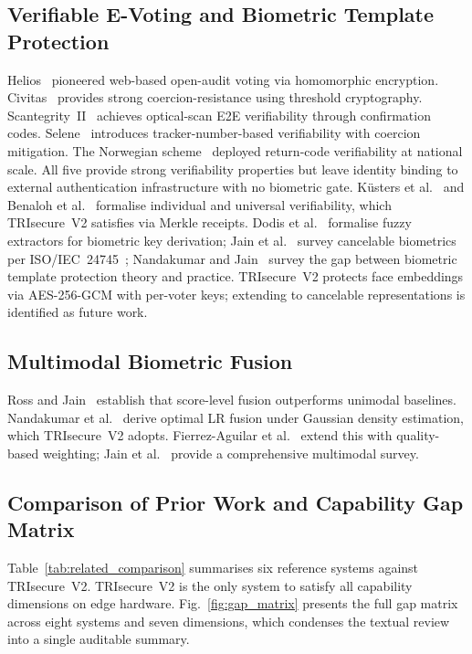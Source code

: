 \documentclass[conference]{IEEEtran}
\begin{document}
\subsection{Verifiable E-Voting and Biometric Template Protection}

Helios~\cite{adida2008helios} pioneered web-based open-audit voting via
homomorphic encryption.
Civitas~\cite{clarkson2008civitas} provides strong coercion-resistance using
threshold cryptography.
Scantegrity~II~\cite{chaum2009scantegrity} achieves optical-scan E2E
verifiability through confirmation codes.
Selene~\cite{ryan2016selene} introduces tracker-number-based verifiability
with coercion mitigation.
The Norwegian scheme~\cite{gjosteen2010norwegian} deployed return-code
verifiability at national scale.
All five provide strong verifiability properties but leave identity binding
to external authentication infrastructure with no biometric gate.
K\"{u}sters et al.~\cite{kusters2010accountability} and
Benaloh et al.~\cite{benaloh2011e2e} formalise individual and universal
verifiability, which TRIsecure~V2 satisfies via Merkle receipts.
Dodis et al.~\cite{dodis2004fuzzy} formalise fuzzy extractors for
biometric key derivation; Jain et al.~\cite{jain2008cancelable} survey
cancelable biometrics per ISO/IEC~24745~\cite{iso24745};
Nandakumar and Jain~\cite{nandakumar2012biometric} survey the gap between
biometric template protection theory and practice. TRIsecure~V2
protects face embeddings via AES-256-GCM with per-voter keys; extending
to cancelable representations is identified as future work.

\subsection{Multimodal Biometric Fusion}

Ross and Jain~\cite{ross2003multimodal} establish that score-level fusion
outperforms unimodal baselines. Nandakumar et al.~\cite{nandakumar2008fusion}
derive optimal LR fusion under Gaussian density estimation, which
TRIsecure~V2 adopts. Fierrez-Aguilar et al.~\cite{fierrez2005fusion}
extend this with quality-based weighting; Jain et al.~\cite{jain2011multimodal}
provide a comprehensive multimodal survey.

\subsection{Comparison of Prior Work and Capability Gap Matrix}

Table~\ref{tab:related_comparison} summarises six reference systems against
TRIsecure~V2. TRIsecure~V2 is the only system to satisfy all capability
dimensions on edge hardware. Fig.~\ref{fig:gap_matrix} presents the full
gap matrix across eight systems and seven dimensions, which condenses the
textual review into a single auditable summary.
\end{document}
